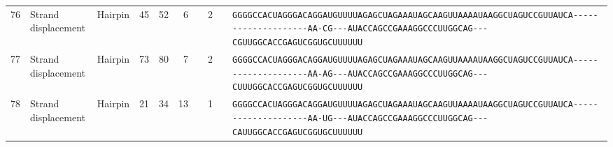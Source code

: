\begin{tabular}{rllrrrrrcl}
 76 & Strand displacement & Hairpin & 45 & 52 & 6 &   & 2 &  &                                                                                                                                                     
 \color{ucsfdarkgrey}\verb|GGGGCCACUAGGGACAGGAU|\color{ucsforange}\verb|GUUUUA|\color{ucsfblue}\verb|GAGCUAGAAAUAGCAAGU|\color{ucsforange}\verb|UAAAAUAA|\color{ucsfnavy}\verb|GGCUAGUCC|\color{ucsforange}\verb|GUUAUCA|\color{ucsfteal}\verb|--------------------AA-CG---|\color{ucsfpurple}\verb|AUACCAGCCGAAAGGCCCUUGGCAG|\color{ucsfteal}\verb|---CGUU|\color{ucsforange}\verb|GGCACCGAGUCGGUGCUUUUUU| \\
                                                                                                                                                                                                                   
 77 & Strand displacement & Hairpin & 73 & 80 & 7 &   & 2 &  &                                                                                                                                                     
 \color{ucsfdarkgrey}\verb|GGGGCCACUAGGGACAGGAU|\color{ucsforange}\verb|GUUUUA|\color{ucsfblue}\verb|GAGCUAGAAAUAGCAAGU|\color{ucsforange}\verb|UAAAAUAA|\color{ucsfnavy}\verb|GGCUAGUCC|\color{ucsforange}\verb|GUUAUCA|\color{ucsfteal}\verb|--------------------AA-AG---|\color{ucsfpurple}\verb|AUACCAGCCGAAAGGCCCUUGGCAG|\color{ucsfteal}\verb|---CUUU|\color{ucsforange}\verb|GGCACCGAGUCGGUGCUUUUUU| \\
                                                                                                                                                                                                                   
 78 & Strand displacement & Hairpin & 21 & 34 & 13 &  & 1 &  &                                                                                                                                                     
 \color{ucsfdarkgrey}\verb|GGGGCCACUAGGGACAGGAU|\color{ucsforange}\verb|GUUUUA|\color{ucsfblue}\verb|GAGCUAGAAAUAGCAAGU|\color{ucsforange}\verb|UAAAAUAA|\color{ucsfnavy}\verb|GGCUAGUCC|\color{ucsforange}\verb|GUUAUCA|\color{ucsfteal}\verb|--------------------AA-UG---|\color{ucsfpurple}\verb|AUACCAGCCGAAAGGCCCUUGGCAG|\color{ucsfteal}\verb|---CAUU|\color{ucsforange}\verb|GGCACCGAGUCGGUGCUUUUUU| \\
                                                                                                                                                                                                                   

\end{tabular}
